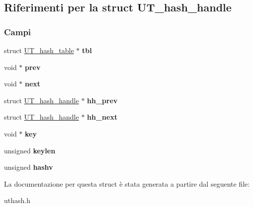 \hypertarget{structUT__hash__handle}{}\subsection{Riferimenti per la struct U\+T\+\_\+hash\+\_\+handle}
\label{structUT__hash__handle}
\subsubsection*{Campi}
\begin{DoxyCompactItemize}
\item 
\mbox{\label{structUT__hash__handle_ad2035ee3b2aa55b22e352341372a5e73}} 
struct \mbox{\hyperlink{structUT__hash__table}{U\+T\+\_\+hash\+\_\+table}} $\ast$ {\bfseries tbl}
\item 
\mbox{\label{structUT__hash__handle_abaf54a69367933df2d45575f48ca6a58}} 
void $\ast$ {\bfseries prev}
\item 
\mbox{\label{structUT__hash__handle_a93bc88ffe97f85ea0d9e0056b7118942}} 
void $\ast$ {\bfseries next}
\item 
\mbox{\label{structUT__hash__handle_a3ec03e34d7975d5c1981c44b324619b2}} 
struct \mbox{\hyperlink{structUT__hash__handle}{U\+T\+\_\+hash\+\_\+handle}} $\ast$ {\bfseries hh\+\_\+prev}
\item 
\mbox{\label{structUT__hash__handle_a4f6989385499ba6f594b0f0facd28325}} 
struct \mbox{\hyperlink{structUT__hash__handle}{U\+T\+\_\+hash\+\_\+handle}} $\ast$ {\bfseries hh\+\_\+next}
\item 
\mbox{\label{structUT__hash__handle_a40690fc15aeaeba8f25385f05f84dd4d}} 
void $\ast$ {\bfseries key}
\item 
\mbox{\label{structUT__hash__handle_af2abdc405972a6bbdee2ade2c0f346c4}} 
unsigned {\bfseries keylen}
\item 
\mbox{\label{structUT__hash__handle_aae5e635fa110556e5007f627089f8323}} 
unsigned {\bfseries hashv}
\end{DoxyCompactItemize}


La documentazione per questa struct è stata generata a partire dal seguente file\+:\begin{DoxyCompactItemize}
\item 
uthash.\+h\end{DoxyCompactItemize}
